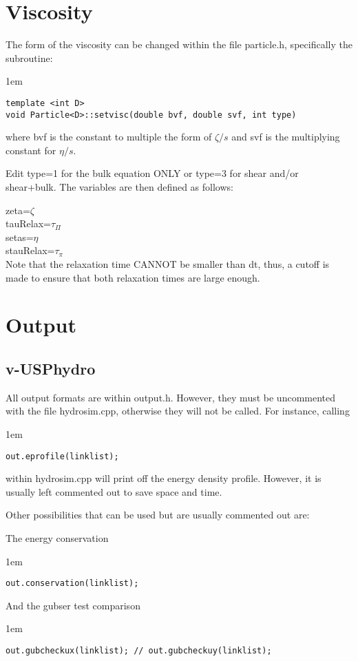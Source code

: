 \documentclass[article]{revtex4-1}
\newcommand{\code}[1]{\bigskip\noindent\begin{addmargin}[3em]{1em}\begin{linenumbers}\texttt{#1}\end{linenumbers}\end{addmargin}\bigskip}
\begin{document}
\section{Viscosity}\label{sec:visc}

The form of the viscosity can be changed within the file particle.h, specifically the subroutine:  

\code{template <int D>\\
void Particle<D>::setvisc(double bvf, double svf, int type)}

where bvf is the constant to multiple the form of $\zeta/s$ and svf is the multiplying constant for $\eta/s$.  

Edit type=1 for the bulk equation ONLY or type=3 for shear and/or shear+bulk.  The variables are then defined as follows:

\noindent zeta=$\zeta$\\
tauRelax=$\tau_{\Pi}$\\
setas=$\eta$\\
stauRelax=$\tau_{\pi}$\\

Note that the relaxation time CANNOT be smaller than dt, thus, a cutoff is made to ensure that both relaxation times are large enough.

\section{Output}\label{sec:out}

\subsection{v-USPhydro}

All output formats are within output.h.  However, they must be uncommented with the file hydrosim.cpp, otherwise they will not be called.  For instance, calling

\code{out.eprofile(linklist);}

within  hydrosim.cpp will print off the energy density profile.  However, it is usually left commented out to save space and time.  

Other possibilities that can be used but are usually commented out are:

The energy conservation

\code{out.conservation(linklist);}

And the gubser test comparison

\code{out.gubcheckux(linklist); // 
out.gubcheckuy(linklist);}
\end{document}

